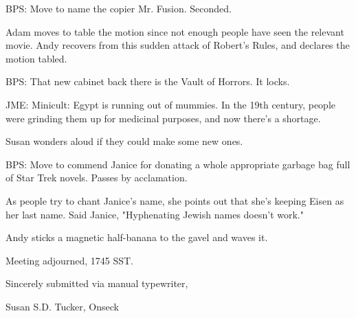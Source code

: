 \documentclass[12pt]{article}
\begin{document}
BPS: Move to name the copier Mr. Fusion. Seconded.

Adam moves to table the motion since not enough people have seen the relevant movie. Andy recovers from this sudden attack of Robert's Rules, and declares the motion tabled.

BPS: That new cabinet back there is the Vault of Horrors. It locks.

JME: Minicult: Egypt is running out of mummies. In the 19th century, people were grinding them up for medicinal purposes, and now there's a shortage.

Susan wonders aloud if they could make some new ones.

BPS: Move to commend Janice for donating a whole appropriate garbage bag full of Star Trek novels. Passes by acclamation.

As people try to chant Janice's name, she points out that she's keeping Eisen as her last name. Said Janice, "Hyphenating Jewish names doesn't work."

Andy sticks a magnetic half-banana to the gavel and waves it.

\vspace{12pt}

\noindent
Meeting adjourned, 1745 SST.

\vspace{18pt}

\centerline{Sincerely submitted via manual typewriter,}
\centerline{Susan S.D. Tucker, Onseck}
\end{document}
